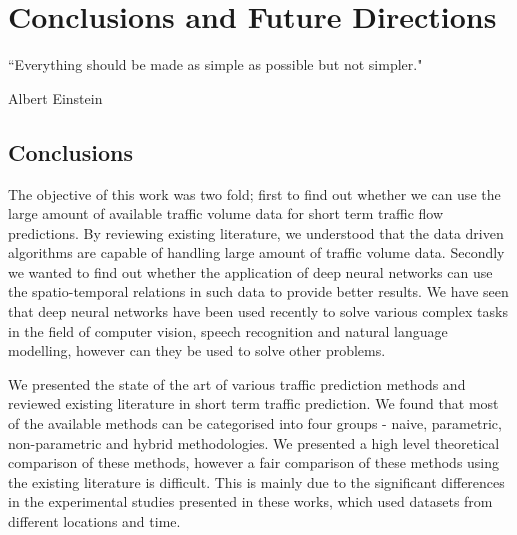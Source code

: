 
\chapter{Conclusions and Future Directions} %

\label{Chapter6} %


``Everything should be made as simple as possible but not simpler."

\begin{flushright}
Albert Einstein
\end{flushright}


\section{Conclusions}

The objective of this work was two fold; first to find out whether we can use the large amount of available
traffic volume data for short term traffic flow predictions. By reviewing existing literature,
we understood that the data driven algorithms are capable of handling large amount of traffic volume
data. Secondly we wanted to find out whether the application of deep neural networks can use the
spatio-temporal relations
in such data to provide better results. We have seen that deep neural networks have been used
recently to solve various complex tasks in the field of computer vision, speech recognition
and natural language modelling, however can they be used to solve other problems.

We presented the state of the art of various traffic prediction methods and reviewed existing literature
in short term traffic prediction. We found that most of the available
methods can be categorised into four groups - naive, parametric, non-parametric and hybrid
methodologies. We presented a high level theoretical comparison of these methods, however a fair
comparison of these methods using the existing literature is difficult. This is mainly due to the
significant differences in the experimental studies presented in these works, which used datasets
from different locations and time.

